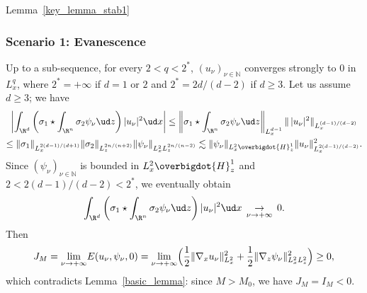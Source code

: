 \begin{ProofOf}{Lemma~\ref{key_lemma_stab1}}
\subsubsection*{Scenario 1: Evanescence} Up to a sub-sequence, for every $2<q<2^{*}$, $(u_{\nu})_{\nu\in\mathbb N}$ converges strongly to $0$ in $L_{x}^{q}$,
where $2^{*}=+\infty$ if $d=1$ or $2$ and $2^{*}=2d/(d-2)$ if $d\geq 3$. Let us assume $d\geq 3$; we have\vspace*{-3pt}
\begin{multline*}
\left|\int_{\R^{d}}\left(\sigma_{1}\star\int_{\R^{n}}\sigma_{2}\psi_{\nu}\ud z\right)|u_{\nu}|^{2}\ud x\right|\leq\left\|\sigma_{1}\star\int_{\R^{n}}\sigma_{2}\psi_{\nu}\ud z\right\|_{L_{x}^{d-1}}\|\,|u_{\nu}|^{2}\|_{L_{x}^{(d-1)/(d-2)}}\\
\leq\|\sigma_{1}\|_{L_{x}^{2(d-1)/(d+1)}}\|\sigma_{2}\|_{L_{z}^{2n/(n+2)}}\|\psi_{\nu}\|_{L_{x}^{2}L_{z}^{2n/(n-2)}}\lesssim\|\psi_{\nu}\|_{L_{x}^{2}\overbigdot{H}_{z}^{1}}\|u_{\nu}\|_{L_{x}^{2(d-1)/(d-2)}}^{2}.
\end{multline*}
Since $(\psi_{\nu})_{\nu\in\mathbb N}$ is bounded in $L_{x}^{2}\overbigdot{H}_{z}^{1}$ and $2<2(d-1)/(d-2)<2^{*}$, we even\-tual\-ly obtain\vspace*{-3pt}
\[
\int_{\R^{d}}\left(\sigma_{1}\star\int_{\R^{n}}\sigma_{2}\psi_{\nu}\ud z\right)|u_{\nu}|^{2}\ud x\,\underset{\nu\to +\infty}{\to}\,0.
\]
Then
\[
J_{M}=\underset{\nu\to+\infty}{\lim}E(u_{\nu},\psi_{\nu},0)=\underset{\nu\to+\infty}{\lim}\Bigl(\frac{1}{2}\|\nabla_{x}u_\nu\|_{L_{x}^{2}}^{2}+\frac{1}{2}\|\nabla_{z}\psi_{\nu}\|_{L_{x}^{2}L_{z}^{2}}^{2}\Bigr)\geq 0,
\]
which contradicts Lemma~\ref{basic_lemma}: since $M>M_0$, we have $J_{M}=I_M<0$.


\end{ProofOf}
